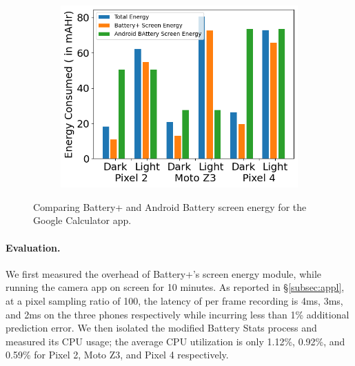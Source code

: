 \begin{figure}[tp]
\begin{minipage}{0.35\columnwidth}
        \vspace{-0.2in}
	\label{fig:tool2_screenshot}
\end{minipage}
\hfill
\begin{minipage}{0.60\columnwidth}
	\begin{subfigure}[]{\textwidth}
		\includegraphics[width=\textwidth]{figure/battery+_screen_energy_compare.png}
	\end{subfigure}
        \vspace{-0.1in}
	\caption{Comparing Battery+ and Android Battery screen energy for the Google Calculator app.}
	\label{fig:tool2_battery_compare}
        \vspace{-0.2in}
\end{minipage}
\end{figure}

\paragraph{Evaluation.}
We first measured the overhead of Battery+'s
screen energy module, while running the camera app on
screen for 10 minutes.  As reported in \S\ref{subsec:appl}, at a pixel
sampling ratio of 100, the latency of per frame recording is
4ms, 3ms, and 2ms on the three phones respectively while incurring less than
1\% 
additional prediction error.  We then isolated the modified Battery Stats
process and measured its CPU usage; the average CPU utilization is
only 1.12\%, 0.92\%, and 0.59\% for Pixel 2, Moto Z3, and Pixel 4 respectively.

